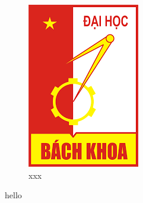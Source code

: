 \lipsum[1]

\begin{figure}[H]
\centering
\includegraphics[scale = 0.4]{pictures/HUST.png}
\caption{xxx}
\end{figure}


hello \cite{key_article}